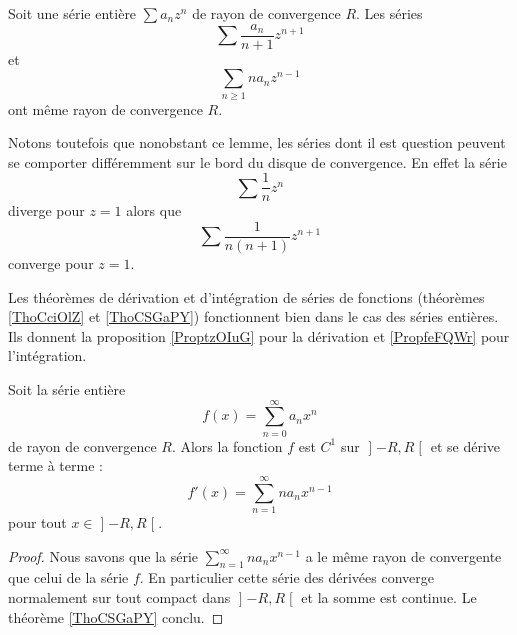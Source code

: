 \begin{lemma}       \label{LemFVMaSD}
    Soit une série entière \( \sum a_nz^n\) de rayon de convergence \( R\). Les séries
    \begin{equation}
        \sum \frac{ a_n }{ n+1 }z^{n+1}
    \end{equation}
    et
    \begin{equation}
        \sum_{n\geq 1}na_nz^{n-1}
    \end{equation}
    ont même rayon de convergence \( R\).
\end{lemma}

Notons toutefois que nonobstant ce lemme, les séries dont il est question peuvent se comporter différemment sur le bord du disque de convergence. En effet la série
\begin{equation}
    \sum \frac{1}{ n }z^n
\end{equation}
diverge pour \( z=1\) alors que 
\begin{equation}
    \sum\frac{1}{ n(n+1) }z^{n+1}
\end{equation}
converge pour \( z=1\).


Les théorèmes de dérivation et d'intégration de séries de fonctions (théorèmes \ref{ThoCciOlZ} et \ref{ThoCSGaPY}) fonctionnent bien dans le cas des séries entières. Ils donnent la proposition \ref{ProptzOIuG} pour la dérivation et \ref{PropfeFQWr} pour l'intégration.

\begin{proposition}     \label{ProptzOIuG}
    Soit la série entière
    \begin{equation}
        f(x)=\sum_{n=0}^{\infty}a_n x^n
    \end{equation}
    de rayon de convergence \( R\). Alors la fonction \( f\) est \( C^1\) sur \( \mathopen] -R , R \mathclose[\) et se dérive terme à terme :
    \begin{equation}
        f'(x)=\sum_{n=1}^{\infty}na_nx^{n-1}
    \end{equation}
    pour tout \( x\in\mathopen] -R , R \mathclose[\).
\end{proposition}

\begin{proof}
    Nous savons que la série \( \sum_{n=1}^{\infty}na_nx^{n-1}\) a le même rayon de convergente que celui de la série \( f\). En particulier cette série des dérivées converge normalement sur tout compact dans \( \mathopen] -R , R \mathclose[\) et la somme est continue. Le théorème \ref{ThoCSGaPY} conclu.
\end{proof}

